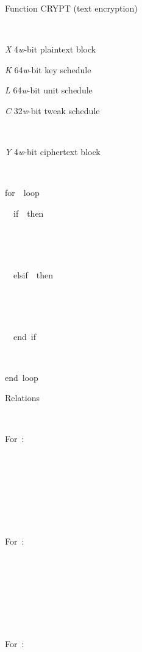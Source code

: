\documentclass[a4paper,oneside,english]{amsart}
\numberwithin{equation}{section}
\numberwithin{figure}{section}
\newenvironment{lyxlist}[1]
{\begin{list}{}
{\settowidth{\labelwidth}{#1}
 \setlength{\leftmargin}{\labelwidth}
 \addtolength{\leftmargin}{\labelsep}
 \renewcommand{\makelabel}[1]{##1\hfil}}}
{\end{list}}
\newenvironment{lyxcode}
{\par\begin{list}{}{
\setlength{\rightmargin}{\leftmargin}
\setlength{\listparindent}{0pt}\raggedright
\setlength{\itemsep}{0pt}
\setlength{\parsep}{0pt}
\normalfont\ttfamily}\item[]}
{\end{list}}
\begin{document}
\begin{algorithm}
\caption{\label{alg:Function-CRYPT}Function CRYPT (text encryption)}

\begin{description}
\item [{Input}]~

\begin{lyxlist}{00.00.0000}
\item [{\emph{X}}] 4\emph{w}-bit plaintext block
\item [{\emph{K}}] 64\emph{w}-bit key schedule
\item [{\emph{L}}] 64\emph{w}-bit unit schedule
\item [{\emph{C}}] 32\emph{w}-bit tweak schedule
\end{lyxlist}
\item [{Output}]~

\begin{lyxlist}{00.00.0000}
\item [{\emph{Y}}] 4\emph{w}-bit ciphertext block
\end{lyxlist}
\item [{Pseudo-code}]~\end{description}
\begin{lyxcode}
\textrm{}

for~~loop

~~if~~then

~~~~

~~~~~

~~elsif~~then

~~~~

~~~~

~~end~if

~~\textrm{}

end~loop

\textrm{}\end{lyxcode}
\begin{description}
\item [{Relations}]~\end{description}
\begin{lyxcode}


For~:

~~

~~

~~

~~

For~:

~~

~~

~~

~~~

For~:

~~~







\end{lyxcode}
\end{algorithm}
 
\end{document}

